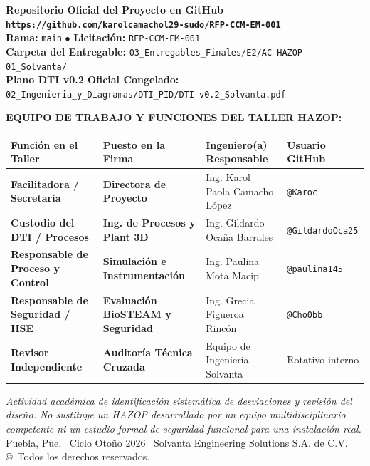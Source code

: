 \documentclass[10pt,letterpaper]{article}
\begin{document}
\begin{titlepage}
\begin{tcolorbox}[colframe=navyblue,colback=white,arc=2mm,boxrule=0.8pt]
        \centering
        \textbf{\color{navyblue}\large Repositorio Oficial del Proyecto en GitHub}\\[2pt]
        \href{https://github.com/karolcamachol29-sudo/RFP-CCM-EM-001}{\texttt{\textbf{https://github.com/karolcamachol29-sudo/RFP-CCM-EM-001}}}\\[3pt]
        \footnotesize
        \textbf{Rama:} \texttt{main} \quad $\bullet$ \quad \textbf{Licitación:} \texttt{RFP-CCM-EM-001}\\[1pt]
        \textbf{Carpeta del Entregable:} \texttt{03\_Entregables\_Finales/E2/AC-HAZOP-01\_Solvanta/}\\
        \textbf{Plano DTI v0.2 Oficial Congelado:} \texttt{02\_Ingenieria\_y\_Diagramas/DTI\_PID/DTI-v0.2\_Solvanta.pdf}
    \end{tcolorbox}
    \vspace{0.25cm}
    \textbf{\large EQUIPO DE TRABAJO Y FUNCIONES DEL TALLER HAZOP:}\\[0.15cm]
    \begin{center}
    \footnotesize
    \setlength{\tabcolsep}{5pt}
    \begin{tabularx}{\textwidth}{>{\bfseries}p{4.2cm} >{\bfseries}p{3.5cm} X >{\centering\arraybackslash}p{2.6cm}}
        \toprule
        \textbf{Función en el Taller} & \textbf{Puesto en la Firma} & \textbf{Ingeniero(a) Responsable} & \textbf{Usuario GitHub} \\
        \midrule
        Facilitadora / Secretaria & Directora de Proyecto & Ing. Karol Paola Camacho López & \texttt{@Karoc} \\
        Custodio del DTI / Procesos & Ing. de Procesos y Plant 3D & Ing. Gildardo Ocaña Barrales & \texttt{@GildardoOca25} \\
        Responsable de Proceso y Control & Simulación e Instrumentación & Ing. Paulina Mota Macip & \texttt{@paulina145} \\
        Responsable de Seguridad / HSE & Evaluación BioSTEAM y Seguridad & Ing. Grecia Figueroa Rincón & \texttt{@Cho0bb} \\
        Revisor Independiente & Auditoría Técnica Cruzada & Equipo de Ingeniería Solvanta & Rotativo interno \\
        \bottomrule
    \end{tabularx}
    \end{center}
    \vfill
    {\footnotesize \textit{Actividad académica de identificación sistemática de desviaciones y revisión del diseño. No sustituye un HAZOP desarrollado por un equipo multidisciplinario competente ni un estudio formal de seguridad funcional para una instalación real.}\\
    Puebla, Pue. \textbar\ Ciclo Otoño 2026 \textbar\ Solvanta Engineering Solutions S.A. de C.V. \copyright\ Todos los derechos reservados.}
\end{titlepage}
\end{document}

